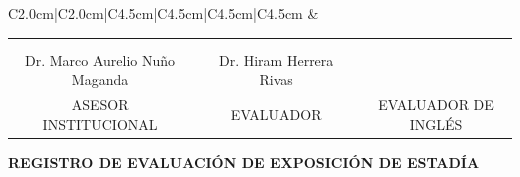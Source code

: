 \documentclass[12pt]{article}
\newcommand{\nasesorinstitucional}{Dr. Marco Aurelio Nuño Maganda}
\newcommand{\nevalador}{Dr. Hiram Herrera Rivas}
\newcommand{\separacionLarga}{0.5cm}
\begin{document}
\begin{landscape}
\begin{tabular}{C{2.0cm}|C{2.0cm}|C{4.5cm}|C{4.5cm}|C{4.5cm}|C{4.5cm}}
&
 \\  \hline

\end{tabular}



\normalsize



\begin{center}
\begin{tabular}{cp{1cm}cp{1cm}c}
 & & & & \\
  & & & & \\
\hline 
\nasesorinstitucional & & \nevalador & & \\
ASESOR INSTITUCIONAL & &EVALUADOR & &EVALUADOR DE INGLÉS \\
\end{tabular}
\end{center}


\end{landscape} 
\restoregeometry

\clearpage
\pagestyle{empty}

\vspace*{0.5cm}



\large
\begin{center}
\textbf{REGISTRO DE EVALUACIÓN DE EXPOSICIÓN DE ESTADÍA}
\\[\separacionLarga]
\end{center}
\end{document}
